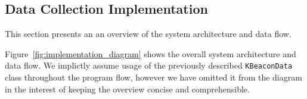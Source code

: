 




\subsection{Data Collection Implementation}\label{sec:data_collection_implementation}
This section presents an an overview of the system architecture and data flow.

Figure~\ref{fig:implementation_diagram} shows the overall system architecture and data flow.
We implictly assume usage of the previously described \texttt{KBeaconData} class throughout the program flow, however we have omitted it from the diagram in the interest of keeping the overview concise and comprehensible.

